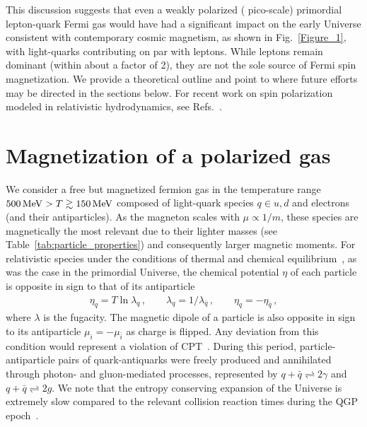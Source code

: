 \documentclass[epjST]{svjour}
\newcommand*{\MeV}{\text{\,MeV}}
\newcommand{\xblue}[1]{{\color{blue}{#1}}}
\begin{document}
This discussion suggests that even a weakly polarized (\xblue{1 in $10^{12}$} pico-scale) primordial lepton-quark Fermi gas would have had a significant impact on the early Universe consistent with contemporary cosmic magnetism, as shown in Fig.~\ref{Figure_1}, with light-quarks contributing on par with leptons. While leptons remain dominant (within about a factor of 2), they are not the sole source of Fermi spin magnetization. We provide a theoretical outline and point to where future efforts may be directed in the sections below. For recent work on spin polarization modeled in relativistic hydrodynamics, see Refs.~\cite{Florkowski:2024cif,Bhadury:2024whs,Becattini:2024uha,Singh:2024cub}.

\section{Magnetization of a polarized gas}
\label{sec:magnetization}
We consider a free but magnetized fermion gas in the temperature range \(500\MeV>T\gtrsim150\MeV\) composed of light-quark species \(q \in {u,d}\) and electrons (and their antiparticles). As the magneton scales with \(\mu \propto 1/m\), these species are magnetically the most relevant due to their lighter masses (see Table~\ref{tab:particle_properties}) and consequently larger magnetic moments. For relativistic species under the conditions of thermal and chemical equilibrium~\cite{Elze:1980er}, as was the case in the primordial Universe, the chemical potential \(\eta\) of each particle is opposite in sign to that of its antiparticle
\begin{align}
\label{eq:equilibirum_conditions}
\eta_{q}=T\ln\lambda_{q}\,,\qquad
\lambda_{q}=1/\lambda_{\bar{q}}\,,\qquad
\eta_{q}=-\eta_{\bar{q}}\,,
\end{align}
where \(\lambda\) is the fugacity. The magnetic dipole of a particle is also opposite in sign to its antiparticle $\mu_{i}=-\mu_{\bar{i}}$ as charge is flipped. Any deviation from this condition would represent a violation of CPT~\cite{Colladay:1996iz,Bluhm:1997ci,BASE:2016yuo}. During this period, particle-antiparticle pairs of quark-antiquarks were freely produced and annihilated through photon- and gluon-mediated processes, represented by \(q+\bar{q}\rightleftharpoons2\gamma\) and \(q+\bar{q}\rightleftharpoons2g\). We note that the entropy conserving expansion of the Universe is extremely slow compared to the relevant collision reaction times during the QGP epoch~\cite{Yang:2024ret}.
\end{document}
